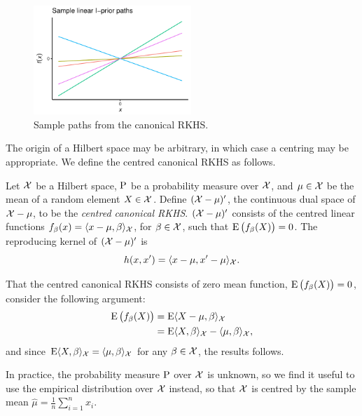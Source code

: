\begin{figure}[H]
  \centering
  \includegraphics[width=0.53\textwidth]{figure/02-kernel_path_canonical}
  \caption{Sample paths from the canonical RKHS.}
\end{figure}

The origin of a Hilbert space may be arbitrary, in which case a centring may be appropriate.
We define the centred canonical RKHS as follows.

\begin{definition}
  Let ${\mathcal X}$ be a Hilbert space, $\operatorname{P}$ be a probability measure over ${\mathcal X}$, and $\mu\in{\mathcal X}$ be the mean of a random element $X\in{\mathcal X}$. 
  Define $({\mathcal X} - \mu)'$, the continuous dual space of ${\mathcal X} - \mu$, to be the \emph{centred canonical RKHS}.
  $({\mathcal X} - \mu)'$ consists of the centred linear functions $f_\beta(x)=\langle x-\mu,\beta\rangle_{\mathcal X}$, for $\beta\in{\mathcal X}$, such that $\operatorname{E} \big( f_\beta(X) \big) = 0$.
  The reproducing kernel of $({\mathcal X} - \mu)'$ is
  \[
    h(x,x') = \langle x-\mu,x'-\mu\rangle_{\mathcal X}.
  \]
\end{definition}

That the centred canonical RKHS consists of zero mean function, $\operatorname{E} \big( f_\beta(X) \big)  = 0$, consider the following argument:
\vspace{-0.5em}
\begin{align*}
  \E \big( f_\beta(X) \big) 
  &= \E \ip{X-\mu,\beta}_\cX \\
  &= \E \ip{X,\beta}_\cX - \ip{\mu,\beta}_\cX, \vspace{-0.5em}
\end{align*}
and since $\operatorname{E} \langle X,\beta\rangle_{\mathcal X} = \langle\mu,\beta\rangle_{\mathcal X}$ for any $\beta\in{\mathcal X}$, the results follows.

\begin{remark}\label{rem:empircent}
  In practice, the probability measure $\operatorname{P}$ over ${\mathcal X}$ is unknown, so we find it useful to use the empirical distribution over ${\mathcal X}$ instead, so that ${\mathcal X}$ is centred by the sample mean $\hat\mu = \frac{1}{n}\sum_{i=1}^n x_i$.  
\end{remark}

